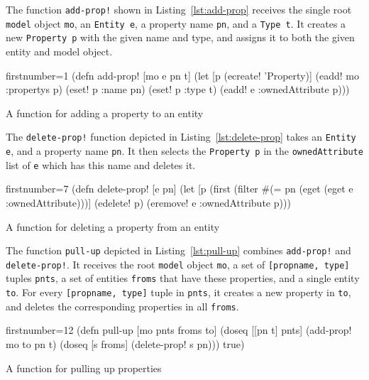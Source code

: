 \documentclass[11pt]{article}
\begin{document}
The function \verb|add-prop!| shown in Listing~\ref{lst:add-prop} receives the
single root \verb|model| object \verb|mo|, an \verb|Entity e|, a property name
\verb|pn|, and a \verb|Type t|.  It creates a new \verb|Property p| with the
given name and type, and assigns it to both the given entity and model object.

\begin{listing}[htbp]
  \begin{clojurecode*}{firstnumber=1}
(defn add-prop! [mo e pn t]
  (let [p (ecreate! 'Property)]
    (eadd! mo :propertys p)
    (eset! p :name pn)
    (eset! p :type t)
    (eadd! e :ownedAttribute p)))
  \end{clojurecode*}
  \caption{A function for adding a property to an entity}
  \label{lst:add-prop}
\end{listing}

The \verb|delete-prop!| function depicted in Listing~\ref{lst:delete-prop}
takes an \verb|Entity e|, and a property name \verb|pn|.  It then selects the
\verb|Property p| in the \verb|ownedAttribute| list of \verb|e| which has this
name and deletes it.

\begin{listing}[htbp]
  \begin{clojurecode*}{firstnumber=7}
(defn delete-prop! [e pn]
  (let [p (first (filter #(= pn (eget %
                         (eget e :ownedAttribute)))]
    (edelete! p)
    (eremove! e :ownedAttribute p)))
  \end{clojurecode*}
  \caption{A function for deleting a property from an entity}
  \label{lst:delete-prop}
\end{listing}

The function \verb|pull-up| depicted in Listing~\ref{lst:pull-up} combines
\verb|add-prop!| and \verb|delete-prop!|.  It receives the root \verb|model|
object \verb|mo|, a set of \verb|[propname, type]| tuples \verb|pnts|, a set of
entities \verb|froms| that have these properties, and a single entity
\verb|to|.  For every \verb|[propname, type]| tuple in \verb|pnts|, it creates a new
property in \verb|to|, and deletes the corresponding properties in all
\verb|froms|.

\begin{listing}[htbp]
  \begin{clojurecode*}{firstnumber=12}
(defn pull-up [mo pnts froms to]
  (doseq [[pn t] pnts]
    (add-prop! mo to pn t)
    (doseq [s froms]
      (delete-prop! s pn)))
  true)
  \end{clojurecode*}
  \caption{A function for pulling up properties}
  \label{lst:pull-up}
\end{listing}
\end{document}
